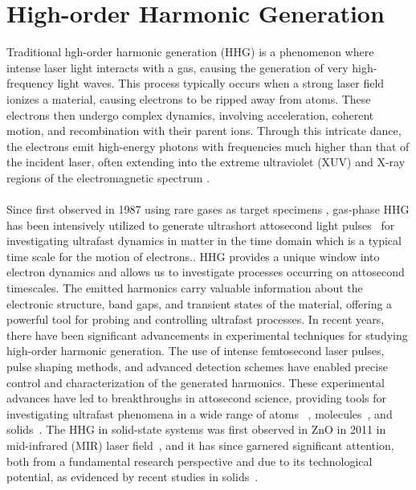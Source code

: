 \section{High-order Harmonic Generation}
Traditional hgh-order harmonic generation (\gls{HHG}) is a phenomenon where intense laser light interacts with a gas, causing the generation of very high-frequency light waves. This process typically occurs when a strong laser field ionizes a material, causing electrons to be ripped away from atoms.
 These electrons then undergo complex dynamics, involving acceleration, coherent motion, and recombination with their parent ions. Through this intricate dance, the electrons emit high-energy photons with frequencies much higher than that of the incident laser, often extending into the extreme ultraviolet (XUV) and X-ray regions of the electromagnetic spectrum \cite{gaumnitz2017streaking}.\\
\\
Since first observed in 1987 using rare gases as target specimens \cite{McPherson:87, Ferray_1988},  gas-phase HHG has been intensively utilized to generate ultrashort attosecond light pulses~\cite{PhysRevLett.68.3535, PhysRevLett.70.1599, PhysRevA.49.2117} for investigating ultrafast dynamics in matter in the time domain which is a typical time scale for the motion of electrons.\cite{baltuvska2003attosecond, Goulielmakis2010, doi:10.1126/science.1260311, doi:10.1126/science.aag1268}. HHG provides a unique window into electron dynamics and allows us to investigate processes occurring on attosecond timescales. The emitted harmonics carry valuable information about the electronic structure, band gaps, and transient states of the material, offering a powerful tool for probing and controlling ultrafast processes.
In recent years, there have been significant advancements in experimental techniques for studying high-order harmonic generation. The use of intense femtosecond laser pulses, pulse shaping methods, and advanced detection schemes have enabled precise control and characterization of the generated harmonics. These experimental advances have led to breakthroughs in attosecond science, providing tools for investigating ultrafast phenomena in a wide range of atoms ~\cite{Goulielmakis2010,PhysRevLett.105.143002,PhysRevLett.106.123601}, molecules~\cite{Warrick2016,Reduzzi2016,PhysRevResearch.3.043222}, and solids~\cite{doi:10.1126/science.1260311, doi:10.1126/science.aag1268, Mashiko2016,Siegrist2019, vampa2017merge}. 
The HHG in solid-state systems was first observed in ZnO in 2011 in mid-infrared (MIR) laser field~\cite{Ghimire2011}, and it has since garnered significant attention, both from a fundamental research perspective and due to its technological potential, as evidenced by recent studies in solids~\cite{Ghimire2019, Silva2019, Nakagawa2022,gorlach2022high, neufeld2023universal}.


